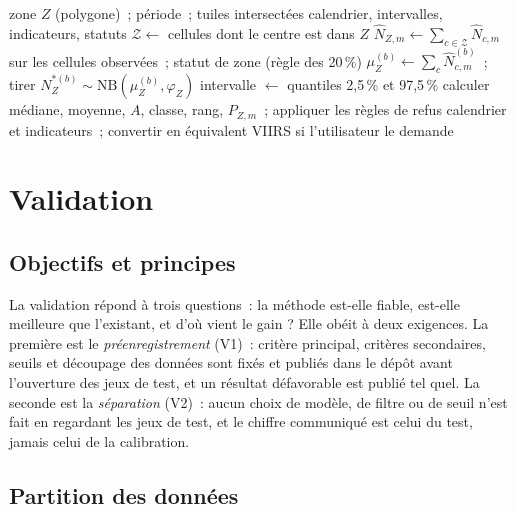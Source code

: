 \documentclass[11pt,a4paper]{article}
\begin{document}
\begin{algorithm}[h]
\caption{Calendrier d'une zone (exécuté dans le navigateur)}
\label{alg:zone}
\begin{algorithmic}[1]
\Require zone $Z$ (polygone)~; période~; tuiles intersectées
\Ensure calendrier, intervalles, indicateurs, statuts
\State $\mathcal{Z} \gets$ cellules dont le centre est dans $Z$ 
  \State $\hat N_{Z,m} \gets \sum_{c\in\mathcal{Z}} \hat N_{c,m}$ sur les cellules observées~; statut de zone (règle des 20\,\%)
     \State $\mu_Z^{(b)} \gets \sum_c \hat N^{(b)}_{c,m}$~; tirer $N_Z^{\ast(b)} \sim \mathrm{NB}(\mu_Z^{(b)},\varphi_Z)$ \EndFor
    \State intervalle $\gets$ quantiles 2,5\,\% et 97,5\,\%
  \EndIf
\EndFor
\State calculer médiane, moyenne, $A$, classe, rang, $P_{Z,m}$~; appliquer les règles de refus
\State \Return calendrier et indicateurs~; convertir en équivalent VIIRS si l'utilisateur le demande
\end{algorithmic}
\end{algorithm}

\section{Validation}\label{sec:validation}

\subsection{Objectifs et principes}

La validation répond à trois questions~: la méthode est-elle fiable, est-elle meilleure que l'existant, et d'où vient le gain ? Elle obéit à deux exigences. La première est le \emph{préenregistrement} (V1)~: critère principal, critères secondaires, seuils et découpage des données sont fixés et publiés dans le dépôt avant l'ouverture des jeux de test, et un résultat défavorable est publié tel quel. La seconde est la \emph{séparation} (V2)~: aucun choix de modèle, de filtre ou de seuil n'est fait en regardant les jeux de test, et le chiffre communiqué est celui du test, jamais celui de la calibration.

\subsection{Partition des données}
\end{document}
